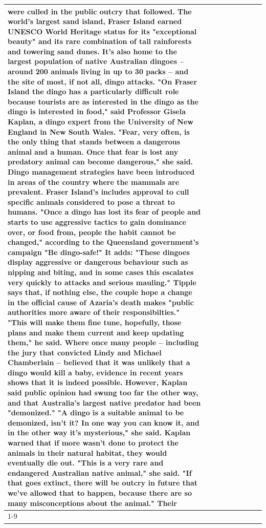 \begin{table}[H]
\begin{tabular}{lllrlllll}
were culled in the public outcry that followed. The world's largest sand island, Fraser Island earned UNESCO World Heritage status for its "exceptional beauty" and its rare combination of tall rainforests and towering sand dunes. It's also home to the largest population of native Australian dingoes -- around 200 animals living in up to 30 packs -- and the site of most, if not all, dingo attacks. "On Fraser Island the dingo has a particularly difficult role because tourists are as interested in the dingo as the dingo is interested in food," said Professor Gisela Kaplan, a dingo expert from the University of New England in New South Wales. "Fear, very often, is the only thing that stands between a dangerous animal and a human. Once that fear is lost any predatory animal can become dangerous," she said. Dingo management strategies have been introduced in areas of the country where the mammals are prevalent. Fraser Island's includes approval to cull specific animals considered to pose a threat to humans. "Once a dingo has lost its fear of people and starts to use aggressive tactics to gain dominance over, or food from, people the habit cannot be changed," according to the Queensland government's campaign "Be dingo-safe!" It adds: "These dingoes display aggressive or dangerous behaviour such as nipping and biting, and in some cases this escalates very quickly to attacks and serious mauling." Tipple says that, if nothing else, the couple hope a change in the official cause of Azaria's death makes "public authorities more aware of their responsibilties." "This will make them fine tune, hopefully, those plans and make them current and keep updating them," he said. Where once many people -- including the jury that convicted Lindy and Michael Chamberlain -- believed that it was unlikely that a dingo would kill a baby, evidence in recent years shows that it is indeed possible. However, Kaplan said public opinion had swung too far the other way, and that Australia's largest native predator had been "demonized." "A dingo is a suitable animal to be demonized, isn't it? In one way you can know it, and in the other way it's mysterious," she said. Kaplan warned that if more wasn't done to protect the animals in their natural habitat, they would eventually die out. "This is a very rare and endangered Australian native animal," she said. "If that goes extinct, there will be outcry in future that we've allowed that to happen, because there are so many misconceptions about the animal." Their \\
\cline{1-9}

\end{tabular}
\end{table}
